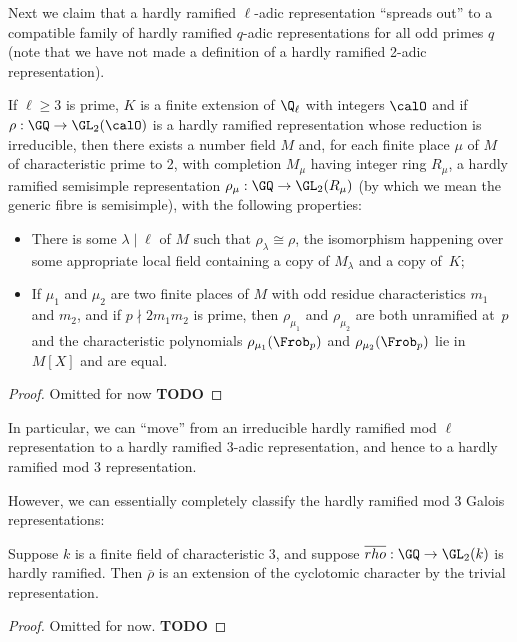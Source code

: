 Next we claim that a hardly ramified $\ell$-adic representation ``spreads out'' to a compatible
family of hardly ramified $q$-adic representations for all odd primes $q$ (note that we have
not made a definition of a hardly ramified 2-adic representation).

\begin{theorem}
  \label{hardly_ramified_spreads_out}
  \leanok
  If $\ell\geq3$ is prime, $K$ is a finite extension of $\Q_\ell$
  with integers $\calO$ and if $\rho:\GQ\to\GL_2(\calO)$ is a hardly ramified representation
  whose reduction is irreducible,
  then there exists a number field $M$ and, for each finite place $\mu$ of $M$
  of characteristic prime to 2, with completion $M_\mu$ having integer ring $R_\mu$,
  a hardly ramified semisimple representation $\rho_\mu:\GQ\to\GL_2(R_\mu)$ (by which we
  mean the generic fibre is semisimple), with the following properties:
  \begin{itemize}
    \item There is some $\lambda\mid\ell$ of $M$ such that $\rho_\lambda\cong\rho$,
      the isomorphism happening over some appropriate local field containing a copy
      of $M_\lambda$ and a copy of~$K$;
    \item If $\mu_1$ and $\mu_2$ are two finite places of $M$ with odd residue characteristics $m_1$
      and $m_2$, and if $p\nmid 2m_1m_2$ is prime, then $\rho_{\mu_1}$ and $\rho_{\mu_2}$
      are both unramified at~$p$ and the characteristic polynomials $\rho_{\mu_1}(\Frob_p)$
      and $\rho_{\mu_2}(\Frob_p)$ lie in $M[X]$ and are equal.
  \end{itemize}
\end{theorem}
\begin{proof}
  Omitted for now {\bf TODO}
\end{proof}

In particular, we can ``move'' from an irreducible hardly ramified mod $\ell$ representation
to a hardly ramified 3-adic representation, and hence to a hardly ramified mod 3 representation.

However, we can essentially completely classify the hardly ramified mod 3 Galois representations:

\begin{theorem}
  \label{hardly_ramified_mod3_reducible}
  \leanok
  Suppose $k$ is a finite field of characteristic 3, and suppose
  $\overline{rho}:\GQ\to\GL_2(k)$ is hardly ramified. Then $\overline{\rho}$ is an extension
  of the cyclotomic character by the trivial representation.
\end{theorem}
\begin{proof}
  Omitted for now. {\bf TODO}
\end{proof}

